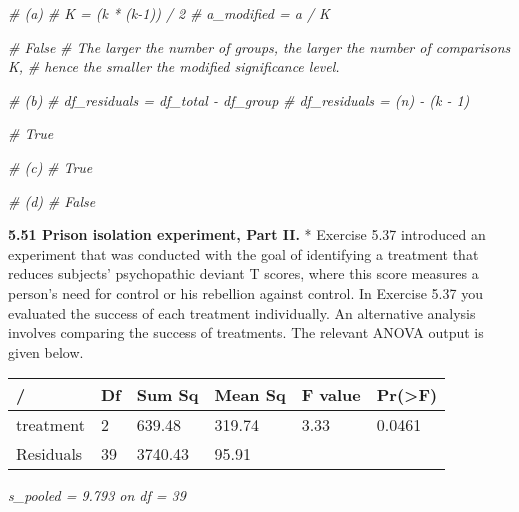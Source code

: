 \documentclass[]{book}
\newenvironment{Shaded}{\begin{snugshade}}{\end{snugshade}}
\newcommand{\CommentTok}[1]{\textcolor[rgb]{0.56,0.35,0.01}{\textit{#1}}}
\begin{document}
\begin{Shaded}
\begin{Highlighting}[]
\CommentTok{# (a)}
\CommentTok{# K = (k * (k-1)) / 2}
\CommentTok{# a_modified = a / K}

\CommentTok{# False}
\CommentTok{# The larger the number of groups, the larger the number of comparisons K,}
\CommentTok{# hence the smaller the modified significance level.}
\end{Highlighting}
\end{Shaded}

\begin{Shaded}
\begin{Highlighting}[]
\CommentTok{# (b)}
\CommentTok{# df_residuals = df_total - df_group}
\CommentTok{# df_residuals = (n) - (k - 1)}

\CommentTok{# True}
\end{Highlighting}
\end{Shaded}

\begin{Shaded}
\begin{Highlighting}[]
\CommentTok{# (c)}
\CommentTok{# True}
\end{Highlighting}
\end{Shaded}

\begin{Shaded}
\begin{Highlighting}[]
\CommentTok{# (d)}
\CommentTok{# False}
\end{Highlighting}
\end{Shaded}

\textbf{5.51 Prison isolation experiment, Part II.}
* Exercise 5.37 introduced an experiment that was conducted with the goal of identifying a treatment that reduces subjects' psychopathic deviant T scores, where this score measures a person's need for control or his rebellion against control. In Exercise 5.37 you evaluated the success of each treatment individually. An alternative analysis involves comparing the success of treatments. The relevant ANOVA output is given below.

\begin{longtable}[]{@{}llllll@{}}
\toprule
/ & Df & Sum Sq & Mean Sq & F value & Pr(\textgreater{}F)\tabularnewline
\midrule
\endhead
treatment & 2 & 639.48 & 319.74 & 3.33 & 0.0461\tabularnewline
Residuals & 39 & 3740.43 & 95.91 & &\tabularnewline
\bottomrule
\end{longtable}

\emph{s\_pooled = 9.793 on df = 39}
\end{document}
